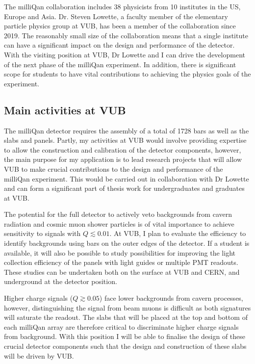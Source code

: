 \documentclass[11pt]{article}
\theoremstyle{plain} \numberwithin{equation}{section}
\theoremstyle{definition}
\begin{document}
The milliQan collaboration includes 38 physicists from 10 institutes in the US, 
Europe and Asia. Dr. Steven Lowette, a faculty member of the elementary particle 
physics group at VUB, has been a member of the collaboration since
2019. The reasonably small size of the collaboration means that a single institute
can have a significant impact on the design and performance of the detector. 
With the visiting position at VUB, Dr Lowette and I can drive the development
of the next phase of the milliQan experiment. In addition,
there is significant scope for students to have vital contributions to 
achieving the physics goals of the experiment.  

\subsection*{Main activities at VUB}

The milliQan detector requires the assembly of a total of 1728 bars as well
as the slabs and panels. Partly, my activities at VUB would involve 
providing expertise to allow the construction and calibration of the detector components, 
however, the main purpose for my application is
to lead research projects that will allow VUB to make crucial contributions to
the design and performance of the milliQan experiment. 
This would be carried out in collaboration with Dr Lowette and
can form a significant part of thesis work for undergraduates and graduates at VUB.

The potential for the full detector to actively veto backgrounds from cavern radiation
and cosmic muon shower particles is of vital importance to 
achieve sensitivity to signals with $Q \lesssim 0.01$. At VUB, I plan to 
evaluate the efficiency to identify backgrounds using 
bars on the outer edges of the detector. If a student is available, it will also
be possible to study possibilities for improving the light collection efficiency of the panels 
with light guides or multiple PMT readouts. These studies can be undertaken 
both on the surface at VUB and CERN, and underground at the detector position.

Higher charge signals ($Q \gtrsim 0.05$) face lower backgrounds from cavern processes,
however, distinguishing the signal from beam muons is difficult as both 
signatures will saturate the readout. The slabs that will be placed at the top and bottom 
of each milliQan array are therefore critical to discriminate higher charge signals from background.
With this position I will be able to finalise the design of these crucial detector components such that the 
design and construction of these slabs will be driven by VUB.
\end{document}
